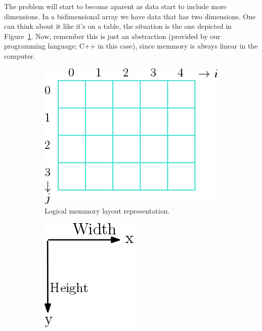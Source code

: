 The problem will start to become aparent as data start to include more dimensions. 
In a bidimensional array we have data that has two dimensions.
One can think about it like it's on a table, the situation is the one depicted in Figure~\ref{fig:2a}. 
Now, remember this is just an abstraction (provided by our programming language; C++ in this case), since memmory is always linear in the computer.

\begin{figure}[htp]
  \centering
  \begin{subfigure}[b]{0.35\textwidth}
    \includegraphics[width=\textwidth]{img/array2D}
    \caption{Logical memmory layout representation.}
  \label{fig:2a}
  \end{subfigure}
  \hspace*{4cm}
  \begin{subfigure}[b]{0.25\textwidth}
    \includegraphics[width=\textwidth]{img/arrow2D}

\end{subfigure}
\end{figure}
